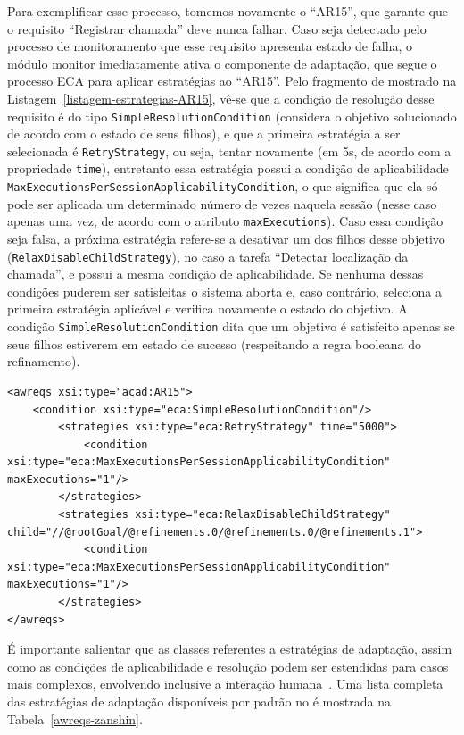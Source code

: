 Para exemplificar esse processo, tomemos novamente o \awreq ``AR15'', que garante que o requisito ``Registrar chamada'' deve nunca falhar. Caso seja detectado pelo processo de monitoramento que esse requisito apresenta estado de falha, o módulo monitor imediatamente ativa o componente de adaptação, que segue o processo ECA para aplicar estratégias ao ``AR15''. Pelo fragmento de \xml mostrado na Listagem~\ref{listagem-estrategias-AR15}, vê-se que a condição de resolução desse requisito é do tipo \texttt{SimpleResolutionCondition} (considera o objetivo solucionado de acordo com o estado de seus filhos), e que a primeira estratégia a ser selecionada é \texttt{RetryStrategy}, ou seja, tentar novamente (em 5s, de acordo com a propriedade \texttt{time}), entretanto essa estratégia possui a condição de aplicabilidade \texttt{MaxExecutionsPerSessionApplicabilityCondition}, o que significa que ela só pode ser aplicada um determinado número de vezes naquela sessão (nesse caso apenas uma vez, de acordo com o atributo \texttt{maxExecutions}). Caso essa condição seja falsa, a próxima estratégia refere-se a desativar um dos filhos desse objetivo (\texttt{RelaxDisableChildStrategy}), no caso a tarefa ``Detectar localização da chamada'', e possui a mesma condição de aplicabilidade. Se nenhuma dessas condições puderem ser satisfeitas o sistema aborta e, caso contrário, seleciona a primeira estratégia aplicável e verifica novamente o estado do objetivo. A condição \texttt{SimpleResolutionCondition} dita que um objetivo é satisfeito apenas se seus filhos estiverem em estado de sucesso (respeitando a regra booleana do refinamento). 

\begin{lstlisting}[caption={Estratégias de adaptação de AR15},label={listagem-estrategias-AR15}]
<awreqs xsi:type="acad:AR15">										
	<condition xsi:type="eca:SimpleResolutionCondition"/>
		<strategies xsi:type="eca:RetryStrategy" time="5000">
			<condition xsi:type="eca:MaxExecutionsPerSessionApplicabilityCondition" maxExecutions="1"/>
		</strategies>
		<strategies xsi:type="eca:RelaxDisableChildStrategy" child="//@rootGoal/@refinements.0/@refinements.0/@refinements.1">
			<condition xsi:type="eca:MaxExecutionsPerSessionApplicabilityCondition" maxExecutions="1"/>
		</strategies>
</awreqs>
\end{lstlisting}

É importante salientar que as classes referentes a estratégias de adaptação, assim como as condições de aplicabilidade e resolução podem ser estendidas para casos mais complexos, envolvendo inclusive a interação humana~\cite{tesevitor}. Uma lista completa das estratégias de adaptação disponíveis por padrão no \zanshin é mostrada na Tabela~\ref{awreqs-zanshin}.

